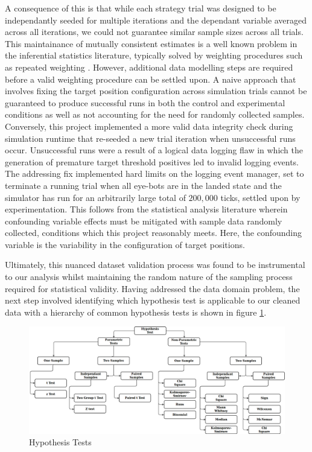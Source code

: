 \documentclass{report}
\begin{document}
 A consequence of this is that while each strategy trial was designed to be independantly seeded for multiple iterations and the dependant variable averaged across all iterations, we could not guarantee similar sample sizes across all trials. This maintainance of mutually consistent estimates is a well known problem in the inferential statistics literature, typically solved by weighting procedures \cite{Kalton2003} \cite{Boonstra2004} such as repeated weighting \cite{Renssen2001}. However, additional data modelling steps are required before a valid weighting procedure can be settled upon. A naive approach that involves fixing the target position configuration across simulation trials cannot be guaranteed to produce successful runs in both the control and experimental conditions as well as not accounting for the need for randomly collected samples. Conversely, this project implemented a more valid data integrity check during simulation runtime that re-seeded a new trial iteration when unsuccessful runs occur. Unsuccessful runs were a result of a logical data logging flaw in which the generation of premature target threshold positives led to invalid logging events. The addressing fix implemented hard limits on the logging event manager, set to terminate a running trial when all eye-bots are in the landed state and the simulator has run for an arbitrarily large total of $200,000$ ticks, settled upon by experimentation. This follows from the statistical analysis literature wherein confounding variable effects must be mitigated with sample data randomly collected, conditions which this project reasonably meets. Here, the confounding variable is the variability in the configuration of target positions.

Ultimately, this nuanced dataset validation process was found to be instrumental to our analysis whilst maintaining the random nature of the sampling process required for statistical validity. Having addressed the data domain problem, the next step involved identifying which hypothesis test is applicable to our cleaned data with a hierarchy of common hypothesis tests is shown in figure \ref{fig:hyp_tests}.

\begin{figure}[h]
	\centering
	\includegraphics[width=\textwidth]{images/HypothesisTest}
	\caption{Hypothesis Tests}
	\label{fig:hyp_tests}
\end{figure}
\end{document}
